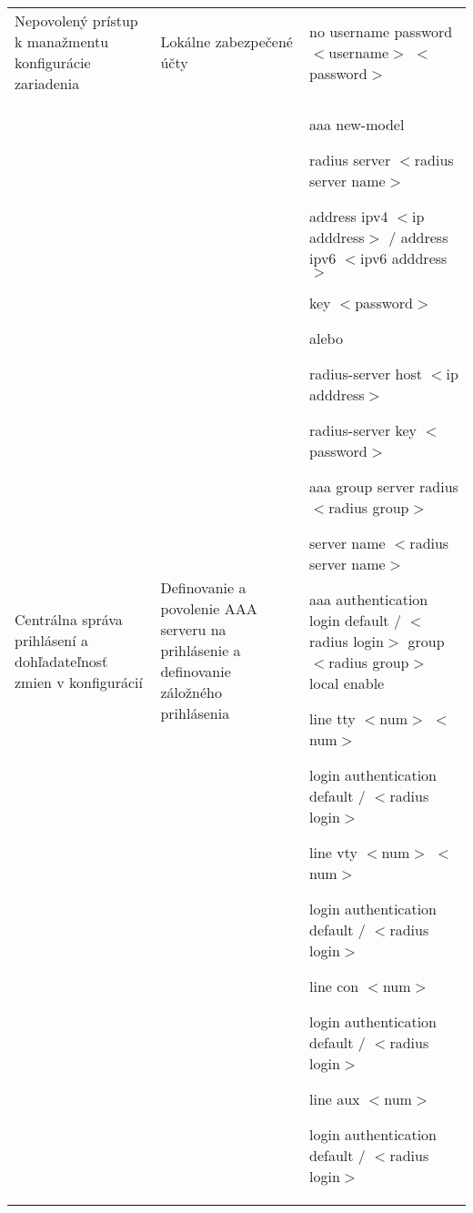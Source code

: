 \begin{longtable}[!htbp]{|L{10em}L{10em}>{\selectfont}L{34em}|}
	
	
	 Nepovolený prístup k manažmentu konfigurácie zariadenia	&Lokálne zabezpečené účty	&no username password  $<$username$>$ $<$password$>$\\
	
	
	
	Centrálna správa prihlásení a dohľadateľnosť zmien v konfigurácií	&Definovanie a povolenie AAA serveru na prihlásenie a definovanie záložného prihlásenia	&aaa new-model
	
	radius server $<$radius server name$>$
	
	\hspace{0.5em}address ipv4 $<$ip adddress$>$ / address ipv6 $<$ipv6 adddress$>$
	
	\hspace{0.5em}key $<$password$>$
	\vspace{0.5em}
	
	{\selectfont alebo}
	
	\vspace{0.5em}
	radius-server host $<$ip adddress$>$
	
	radius-server key $<$password$>$
	
	\vspace{0.5em}
	
	aaa group server radius $<$radius group$>$
	
	\hspace{0.5em}server name $<$radius server name$>$
	
	aaa authentication login default / $<$radius login$>$ group $<$radius group$>$ local enable
	
	line tty $<$num$>$ $<$num$>$
	
	\hspace{0.5em}login authentication default / $<$radius login$>$
	
	line vty $<$num$>$ $<$num$>$
	
	\hspace{0.5em}login authentication default / $<$radius login$>$
	
	line con $<$num$>$
	
	\hspace{0.5em}login authentication default / $<$radius login$>$
	
	line aux $<$num$>$
	
	
	\hspace{0.5em}login authentication default / $<$radius login$>$\\
	

\end{longtable}
